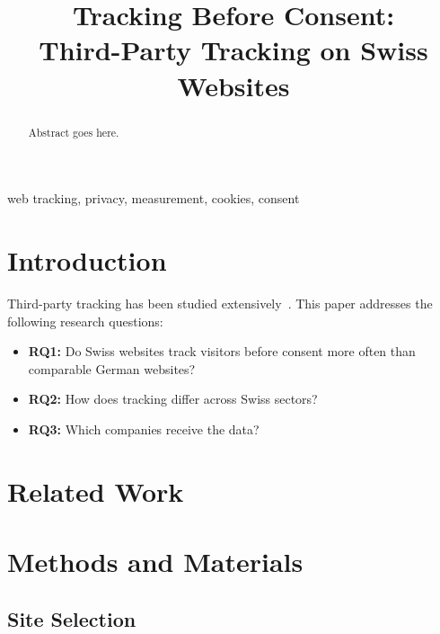 \documentclass[conference]{IEEEtran}
\begin{document}
\title{Tracking Before Consent:\\Third-Party Tracking on Swiss Websites}

\author{
}

\maketitle

\begin{abstract}
Abstract goes here.
\end{abstract}

\begin{IEEEkeywords}
web tracking, privacy, measurement, cookies, consent
\end{IEEEkeywords}

\section{Introduction}
Third-party tracking has been studied extensively~\cite{englehardtOnlineTracking1millionsite2016,mayerThirdPartyWebTracking2012}.
This paper addresses the following research questions:
\begin{itemize}
  \item \textbf{RQ1:} Do Swiss websites track visitors before consent more often than comparable German websites?
  \item \textbf{RQ2:} How does tracking differ across Swiss sectors?
  \item \textbf{RQ3:} Which companies receive the data?
\end{itemize}

\section{Related Work}

\section{Methods and Materials}
\subsection{Site Selection}
\end{document}
